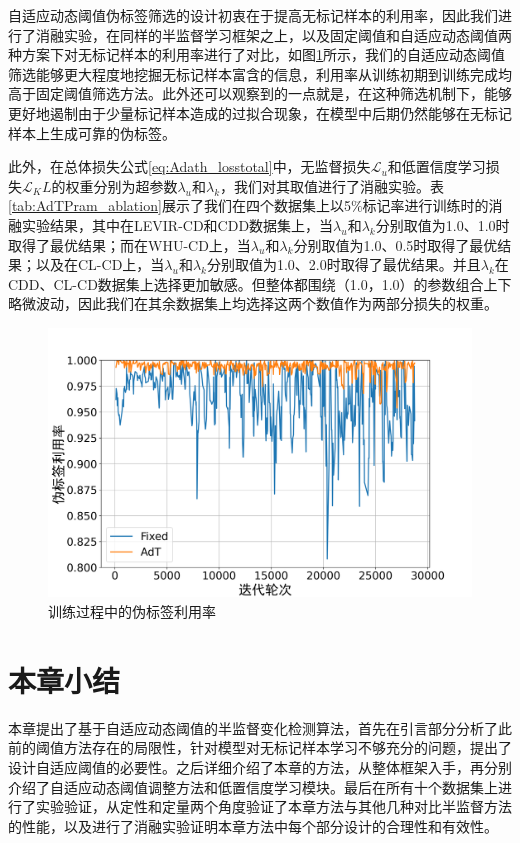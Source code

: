 \documentclass[lang=chs, degree=master, blindreview=false, adobe=false]{yanputhesis}
\begin{document}
自适应动态阈值伪标签筛选的设计初衷在于提高无标记样本的利用率，因此我们进行了消融实验，在同样的半监督学习框架之上，以及固定阈值和自适应动态阈值两种方案下对无标记样本的利用率进行了对比，如图\ref{fig:AdT_util}所示，我们的自适应动态阈值筛选能够更大程度地挖掘无标记样本富含的信息，利用率从训练初期到训练完成均高于固定阈值筛选方法。此外还可以观察到的一点就是，在这种筛选机制下，能够更好地遏制由于少量标记样本造成的过拟合现象，在模型中后期仍然能够在无标记样本上生成可靠的伪标签。

此外，在总体损失公式\ref{eq:Adath_losstotal}中，无监督损失$\mathcal{L}_u$和低置信度学习损失$\mathcal{L}_KL$的权重分别为超参数$\lambda_u$和$\lambda_k$，我们对其取值进行了消融实验。表\ref{tab:AdTPram_ablation}展示了我们在四个数据集上以5$\%$标记率进行训练时的消融实验结果，其中在LEVIR-CD和CDD数据集上，当$\lambda_u$和$\lambda_k$分别取值为1.0、1.0时取得了最优结果；而在WHU-CD上，当$\lambda_u$和$\lambda_k$分别取值为1.0、0.5时取得了最优结果；以及在CL-CD上，当$\lambda_u$和$\lambda_k$分别取值为1.0、2.0时取得了最优结果。并且$\lambda_k$在CDD、CL-CD数据集上选择更加敏感。但整体都围绕（1.0，1.0）的参数组合上下略微波动，因此我们在其余数据集上均选择这两个数值作为两部分损失的权重。
\begin{figure}[!htbp]
  \centering
  \includegraphics[scale=0.35]{images/AdTutil_ratio.png}
  \caption{
    训练过程中的伪标签利用率
  }
  \label{fig:AdT_util}
\end{figure}
\section{本章小结}
本章提出了基于自适应动态阈值的半监督变化检测算法，首先在引言部分分析了此前的阈值方法存在的局限性，针对模型对无标记样本学习不够充分的问题，提出了设计自适应阈值的必要性。之后详细介绍了本章的方法，从整体框架入手，再分别介绍了自适应动态阈值调整方法和低置信度学习模块。最后在所有十个数据集上进行了实验验证，从定性和定量两个角度验证了本章方法与其他几种对比半监督方法的性能，以及进行了消融实验证明本章方法中每个部分设计的合理性和有效性。
\cleardoublepage
\end{document}
